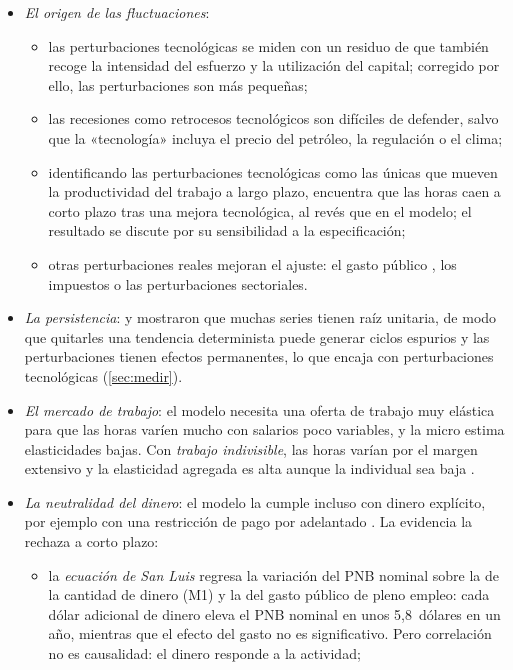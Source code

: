 \documentclass[11pt]{article}
\begin{document}
\begin{itemize}
\item \emph{El origen de las fluctuaciones}:
  \begin{itemize}
  \item las perturbaciones tecnológicas se miden con un residuo de  que también recoge la intensidad del esfuerzo y la utilización del capital; corregido por ello, las perturbaciones son más pequeñas\nocite{BurnsideEichenbaumRebelo1993Labor,BasuFernaldKimball2006Are};
  \item las recesiones como retrocesos tecnológicos son difíciles de defender, salvo que la «tecnología» incluya el precio del petróleo, la regulación o el clima;
  \item identificando las perturbaciones tecnológicas como las únicas que mueven la productividad del trabajo a largo plazo, \textcite{Gali1999Technology} encuentra que las horas caen a corto plazo tras una mejora tecnológica, al revés que en el modelo; el resultado se discute por su sensibilidad a la especificación;
  \item otras perturbaciones reales mejoran el ajuste: el gasto público\nocite{ChristianoEichenbaum1992Current,BaxterKing1993Fiscal} , los impuestos\nocite{McGrattan1994Macroeconomic} o las perturbaciones sectoriales\nocite{LongPlosser1983Real}.
  \end{itemize}
\item \emph{La persistencia}: \textcite{NelsonKang1981Spurious} y \textcite{NelsonPlosser1982Trends} mostraron que muchas series tienen raíz unitaria, de modo que quitarles una tendencia determinista puede generar ciclos espurios y las perturbaciones tienen efectos permanentes, lo que encaja con perturbaciones tecnológicas (\ref{sec:medir}).
\item \emph{El mercado de trabajo}: el modelo necesita una oferta de trabajo muy elástica para que las horas varíen mucho con salarios poco variables, y la micro estima elasticidades bajas. Con \emph{trabajo indivisible}, las horas varían por el margen extensivo y la elasticidad agregada es alta aunque la individual sea baja\nocite{Hansen1985Indivisible,Rogerson1988Indivisible} .
\item \emph{La neutralidad del dinero}: el modelo la cumple incluso con dinero explícito, por ejemplo con una restricción de pago por adelantado\nocite{CooleyHansen1989Inflation} . La evidencia la rechaza a corto plazo:
  \begin{itemize}
  \item la \emph{ecuación de San Luis}\nocite{AndersenJordan1968Monetary} regresa la variación del PNB nominal sobre la de la cantidad de dinero (M1) y la del gasto público de pleno empleo: cada dólar adicional de dinero eleva el PNB nominal en unos 5,8~dólares en un año, mientras que el efecto del gasto no es significativo. Pero correlación no es causalidad: el dinero responde a la actividad;

\end{itemize}
\end{itemize}
\end{document}
